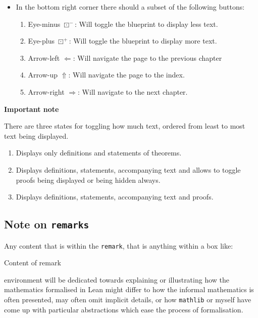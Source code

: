 \begin{itemize}
    \item In the bottom right corner there should a subset of the following buttons: 
        \begin{enumerate}
            \item Eye-minus $\boxdot^-$: Will toggle the blueprint to display less text.
            \item Eye-plus $\boxdot^+$: Will toggle the blueprint to display more text. 
            \item Arrow-left $\Leftarrow$: Will navigate the page to the previous chapter
            \item Arrow-up $\Uparrow$: Will navigate the page to the index.
            \item Arrow-right $\Rightarrow$: Will navigate to the next chapter.
        \end{enumerate}
\end{itemize}

\textbf{Important note}

There are three states for toggling how much text, ordered from least to most text being displayed.

\begin{enumerate}
    \item Displays only definitions and statements of theorems.
    \item Displays definitions, statements, accompanying text and allows to toggle proofs being displayed or being hidden always.
    \item Displays definitions, statements, accompanying text and proofs.
\end{enumerate}

\subsection{Note on \texttt{remarks}}

Any content that is within the \texttt{remark}, that is anything within a box like:

\begin{remark}[A remark]
    Content of remark
\end{remark}

environment will be dedicated towards explaining or illustrating how the mathematics formalised in Lean might differ to 
how the informal mathematics is often presented, may often omit implicit details, or how \texttt{mathlib} or myself have come up with particular
abstractions which ease the process of formalisation.

